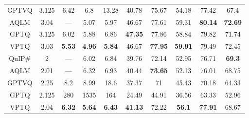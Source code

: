 \begin{table}[hbt!]
{\begin{tabular}{c|ccccccccc}
GPTVQ             & 3.125                & 6.42                    & 6.8                     & 13.28                   & 40.78               & 75.67               & 54.18               & 77.42               & 67.4                \\
AQLM              & 3.04                 & ---                     & 5.07                    & 5.97                    & 46.67               & 77.61               & 59.31               & \textbf{80.14}      & \textbf{72.69}      \\
GPTQ              & 3.125                & 6.02                    & 5.88                    & 6.86                    & \textbf{47.35}      & 77.86               & 58.84               & 79.82               & 71.74               \\
VPTQ              & 3.03                 & \textbf{5.53}           & \textbf{4.96}           & \textbf{5.84}           & 46.67               & \textbf{77.95}      & \textbf{59.91}      & 79.49               & 72.45               \\ \hline
QuIP\#            & 2                    & ---                     & 6.02                    & 6.84                    & 39.76               & 72.14               & 52.95               & 76.71               & \textbf{69.3}       \\
AQLM              & 2.01                 & ---                     & 6.32                    & 6.93                    & 40.44               & \textbf{73.65}      & 52.13               & 76.01               & 68.75               \\
GPTVQ             & 2.25                 & 8.2                     & 8.99                    & 18.6                    & 37.37               & 71                  & 45.43               & 70.18               & 64.33               \\
GPTQ              & 2.125                & 280                     & 1535                    & 164                     & 24.49               & 44.91               & 36.56               & 63.33               & 52.96               \\
VPTQ              & 2.04                 & \textbf{6.32}           & \textbf{5.64}           & \textbf{6.43}           & \textbf{41.13}      & 72.22               & \textbf{56.1}       & \textbf{77.91}      & 68.67               \\ \hline
\end{tabular}
}
\end{table}